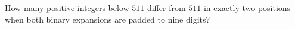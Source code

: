 How many positive integers below $511$ differ from $511$ in exactly two positions when both binary expansions are padded to nine digits?
